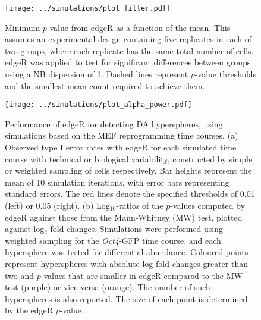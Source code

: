 \documentclass{article}
\begin{document}
\begin{figure}[tbp]
    \begin{center}
    \texttt{[image: ../simulations/plot\_filter.pdf]}
    \end{center}
    \caption{Minimum $p$-value from edgeR as a function of the mean.
        This assumes an experimental design containing five replicates in each of two groups, where each replicate has the same total number of cells.
        edgeR was applied to test for significant differences between groups using a NB dispersion of 1.
        Dashed lines represent $p$-value thresholds and the smallest mean count required to achieve them.
  }
    \label{fig:filter}
\end{figure}

\begin{figure}[btp]
    \begin{center}
        \texttt{[image: ../simulations/plot\_alpha\_power.pdf]}
    \end{center}
    \caption{
        Performance of edgeR for detecting DA hyperspheres, using simulations based on the MEF reprogramming time courses.
        (a) Observed type I error rates with edgeR for each simulated time course with technical or biological variability, constructed by simple or weighted sampling of cells respectively.
        Bar heights represent the mean of 10 simulation iterations, with error bars representing standard errors.
        The red lines denote the specified thresholds of 0.01 (left) or 0.05 (right).
        (b) Log$_{10}$-ratios of the $p$-values computed by edgeR against those from the Mann-Whitney (MW) test, plotted against log$_{2}$-fold changes.
        Simulations were performed using weighted sampling for the \textit{Oct4}-GFP time course, and each hypersphere was tested for differential abundance.
        Coloured points represent hyperspheres with absolute log-fold changes greater than two and $p$-values that are smaller in edgeR compared to the MW test (purple) or vice versa (orange).
        The number of such hyperspheres is also reported.
        The size of each point is determined by the edgeR $p$-value.
    }
    \label{fig:testtest}
\end{figure}
\end{document}
